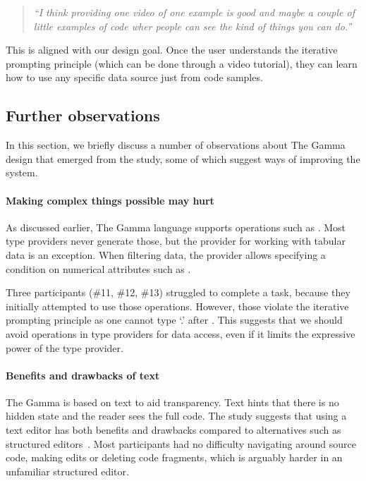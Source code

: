 \documentclass[manuscript,review,anonymous]{acmart}
\begin{document}
\begin{quote}
  \emph{``I think providing one video of one example is good and maybe a couple of little examples
  of code wher people can see the kind of things you can do.''}
\end{quote}

This is aligned with our design goal. Once the user understands the iterative prompting principle
(which can be done through a video tutorial), they can learn how to use any specific data source
just from code samples.

\subsection{Further observations}
In this section, we briefly discuss a number of observations about The Gamma design that
emerged from the study, some of which suggest ways of improving the system.

\paragraph{Making complex things possible may hurt}
As discussed earlier, The Gamma language supports operations such as . Most type
providers never generate those, but the provider for working with tabular data is an exception.
When filtering data, the provider allows specifying a condition on numerical attributes such as
.

Three participants (\#11, \#12, \#13) struggled to complete a task, because they
initially attempted to use those operations. However, those violate the iterative prompting
principle as one cannot type `.' after .
This suggests that we should avoid operations in type providers for data access, even if it
limits the expressive power of the type provider.

\paragraph{Benefits and drawbacks of text}
The Gamma is based on text to aid transparency. Text hints that there is no hidden state and
the reader sees the full code. The study suggests that using a text editor has both
benefits and drawbacks compared to alternatives such as structured editors~\cite{structure-based,livenut,lamdu}.
Most participants had no difficulty navigating around source code, making edits or deleting code
fragments, which is arguably harder in an unfamiliar structured editor.
\end{document}
